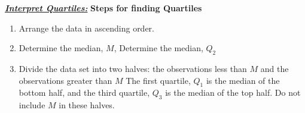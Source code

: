 \documentclass{report}
\begin{document}
         \bigbreak \noindent \bigbreak \noindent 
         \textbf{\textit{\underline{Interpret Quartiles:}}}
         \bigbreak \noindent 
         \textbf{Steps for finding Quartiles}
         \begin{enumerate}
             \item Arrange the data in ascending order.
             \item Determine the median, $M $, Determine the median, $Q_{2}$
             \item Divide the data set into two halves: the observations less than $M$  and the observations greater than $M$  The first quartile, $Q_{1}$  is the median of the bottom half, and the third quartile, $Q_{3}$  is the median of the top half. Do not include $M$ in these halves.
         \end{enumerate}



    
\end{document}
